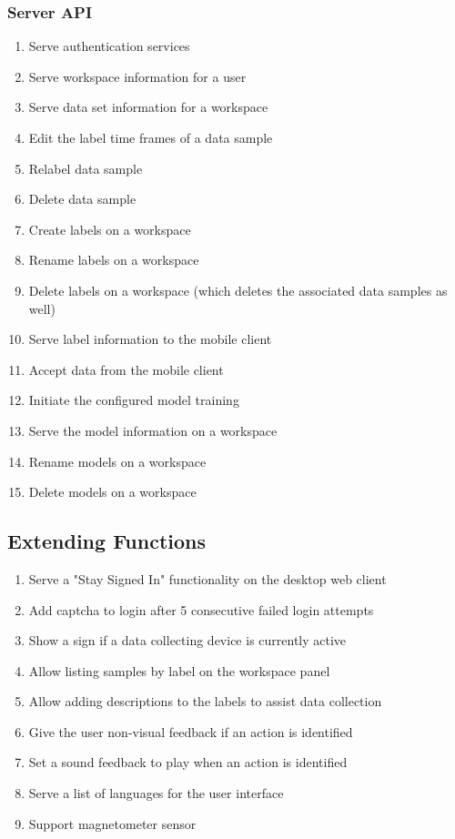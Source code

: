 \subsubsection{Server API}
\begin{enumerate}[resume*]
    \item Serve authentication services
    \item Serve workspace information for a user
    \item Serve data set information for a workspace
    \item Edit the label time frames of a data sample
    \item Relabel data sample
    \item Delete data sample
    \item Create labels on a workspace
    \item Rename labels on a workspace
    \item Delete labels on a workspace (which deletes the associated data samples as well)
    \item Serve label information to the mobile client
    \item Accept data from the mobile client
    \item Initiate the configured model training
    \item Serve the model information on a workspace
    \item Rename models on a workspace
    \item Delete models on a workspace
\end{enumerate}

\subsection{Extending Functions}
\begin{enumerate}[resume*]
    \item Serve a "Stay Signed In" functionality on the desktop web client
    \item Add captcha to login after 5 consecutive failed login attempts
    \item Show a sign if a data collecting device is currently active
    \item Allow listing samples by label on the workspace panel
    \item Allow adding descriptions to the labels to assist data collection
    \item \label{/F480/} Give the user non-visual feedback if an action is identified
    \item Set a sound feedback to play when an action is identified
    \item Serve a list of languages for the user interface
    \item Support magnetometer sensor
\end{enumerate}